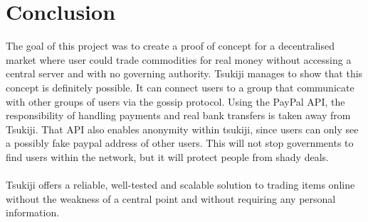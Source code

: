 \section{Conclusion}
The goal of this project was to create a proof of concept for a decentralised market where user could trade commodities for real money without accessing a central server and with no governing authority.
Tsukiji manages to show that this concept is definitely possible. It can connect users to a group that communicate with other groups of users via the gossip protocol.
Using the PayPal API, the responsibility of handling payments and real bank transfers is taken away from Tsukiji.
That API also enables anonymity within tsukiji, since users can only see a possibly fake paypal address of other users.
This will not stop governments to find users within the network, but it will protect people from shady deals.\\
\\
Tsukiji offers a reliable, well-tested and scalable solution to trading items online without the weakness of a central point and without requiring any personal information.
